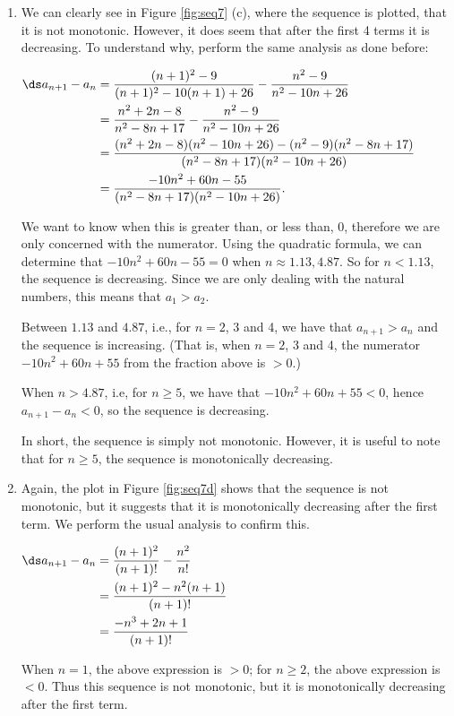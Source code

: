 {\begin{enumerate}
\item		We can clearly see in Figure \ref{fig:seq7} (c), where the sequence is plotted, that it is not monotonic. However, it does seem that after the first 4 terms it is decreasing. To understand why, perform the same analysis as done before:

						\hfill $\ds \begin{aligned}[t]	
						a_{n+1}-a_n &= \frac{(n+1)^2-9}{(n+1)^2-10(n+1)+26} - \frac{n^2-9}{n^2-10n+26} \\		
								&= \frac{n^2+2n-8}{n^2-8n+17}-\frac{n^2-9}{n^2-10n+26}\\
								&= \frac{(n^2+2n-8)(n^2-10n+26)-(n^2-9)(n^2-8n+17)}{(n^2-8n+17)(n^2-10n+26)}\\
								&= \frac{-10n^2+60n-55}{(n^2-8n+17)(n^2-10n+26)}.
								\end{aligned}$\hfill \null		

We want to know when this is greater than, or less than, 0, therefore we are only concerned with the numerator. Using the quadratic formula, we can determine that $-10n^2+60n-55=0$ when $n\approx 1.13, 4.87$. So for $n<1.13$, the sequence is decreasing. Since we are only dealing with the natural numbers, this means that $a_1 > a_2$.

Between $1.13$ and $4.87$, i.e., for $n=2$, 3 and 4, we have that $a_{n+1}>a_n$ and the sequence is increasing. (That is, when $n=2$, 3 and 4, the numerator $-10n^2+60n+55$ from the fraction above is $>0$.)

When $n> 4.87$, i.e, for $n\geq 5$, we have that $-10n^2+60n+55<0$, hence $a_{n+1}-a_n<0$, so the sequence is decreasing.

In short, the sequence is simply not monotonic. However, it is useful to note that for $n\geq 5$, the sequence is monotonically decreasing. 

\item		Again, the plot in Figure \ref{fig:seq7d} shows that the sequence is not monotonic, but it suggests that it is monotonically decreasing after the first term. We perform the usual analysis to confirm this.

					\hfill $\ds \begin{aligned}[t]	
						a_{n+1}-a_n &= \frac{(n+1)^2}{(n+1)!} - \frac{n^2}{n!} \\
								&= \frac{(n+1)^2-n^2(n+1)}{(n+1)!} \\
								&=	\frac{-n^3+2n+1}{(n+1)!}
					\end{aligned}$\hfill \null
					
When $n=1$, the above expression is $>0$; for $n\geq 2$, the above expression is $<0$. Thus this sequence is not monotonic, but it is monotonically decreasing after the first term.
\end{enumerate}
\baselineskip
}\\

